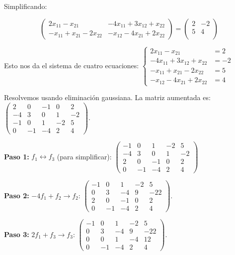 \begin{myproof}
Simplificando:

$$\left( \begin{array}{cc}
2x_{11} - x_{21} & -4x_{11} + 3x_{12} + x_{22} \\
-x_{11} + x_{21} - 2x_{22} & -x_{12} - 4x_{21} + 2x_{22}
\end{array} \right) = \left( \begin{array}{cc}
2&-2\\
5&4\\ \end{array} \right)$$

Esto nos da el sistema de cuatro ecuaciones: $\begin{cases}
2x_{11} - x_{21} &= 2\\
-4x_{11} + 3x_{12} + x_{22} &= -2\\
-x_{11} + x_{21} - 2x_{22} &= 5\\
-x_{12} - 4x_{21} + 2x_{22} &= 4
\end{cases}$

Resolvemos usando eliminación gaussiana. La matriz aumentada es: $\left(\begin{array}{cccc|c}
2 & 0 & -1 & 0 & 2 \\
-4 & 3 & 0 & 1 & -2 \\
-1 & 0 & 1 & -2 & 5 \\
0 & -1 & -4 & 2 & 4
\end{array}\right).$

\textbf{Paso 1:} $f_1 \leftrightarrow f_3$ (para simplificar): $\left(\begin{array}{cccc|c}
-1 & 0 & 1 & -2 & 5 \\
-4 & 3 & 0 & 1 & -2 \\
2 & 0 & -1 & 0 & 2 \\
0 & -1 & -4 & 2 & 4
\end{array}\right)$

\textbf{Paso 2:} $-4f_1 + f_2 \to f_2$: $\left(\begin{array}{cccc|c}
-1 & 0 & 1 & -2 & 5 \\
0 & 3 & -4 & 9 & -22 \\
2 & 0 & -1 & 0 & 2 \\
0 & -1 & -4 & 2 & 4
\end{array}\right).$

\textbf{Paso 3:} $2f_1 + f_3 \to f_3$: $\left(\begin{array}{cccc|c}
-1 & 0 & 1 & -2 & 5 \\
0 & 3 & -4 & 9 & -22 \\
0 & 0 & 1 & -4 & 12 \\
0 & -1 & -4 & 2 & 4
\end{array}\right).$


\end{myproof}
